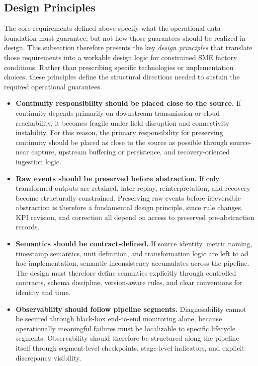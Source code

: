 \documentclass[systems,article,submit,pdftex,moreauthors]{Definitions/mdpi}
\begin{document}
\subsection{Design Principles}
\label{sec:design_principles}

The core requirements defined above specify what the operational data foundation must guarantee, but not how those guarantees should be realized in design. This subsection therefore presents the key \emph{design principles} that translate those requirements into a workable design logic for constrained SME factory conditions. Rather than prescribing specific technologies or implementation choices, these principles define the structural directions needed to sustain the required operational guarantees.

\begin{itemize}
    \item[\textbf{P1.}] \textbf{Continuity responsibility should be placed close to the source.} If continuity depends primarily on downstream transmission or cloud reachability, it becomes fragile under field disruption and connectivity instability. For this reason, the primary responsibility for preserving continuity should be placed as close to the source as possible through source-near capture, upstream buffering or persistence, and recovery-oriented ingestion logic.

    \item[\textbf{P2.}] \textbf{Raw events should be preserved before abstraction.} If only transformed outputs are retained, later replay, reinterpretation, and recovery become structurally constrained. Preserving raw events before irreversible abstraction is therefore a fundamental design principle, since rule changes, KPI revision, and correction all depend on access to preserved pre-abstraction records.

    \item[\textbf{P3.}] \textbf{Semantics should be contract-defined.} If source identity, metric naming, timestamp semantics, unit definition, and transformation logic are left to ad hoc implementation, semantic inconsistency accumulates across the pipeline. The design must therefore define semantics explicitly through controlled contracts, schema discipline, version-aware rules, and clear conventions for identity and time.

    \item[\textbf{P4.}] \textbf{Observability should follow pipeline segments.} Diagnosability cannot be secured through black-box end-to-end monitoring alone, because operationally meaningful failures must be localizable to specific lifecycle segments. Observability should therefore be structured along the pipeline itself through segment-level checkpoints, stage-level indicators, and explicit discrepancy visibility.


\end{itemize}
\end{document}
